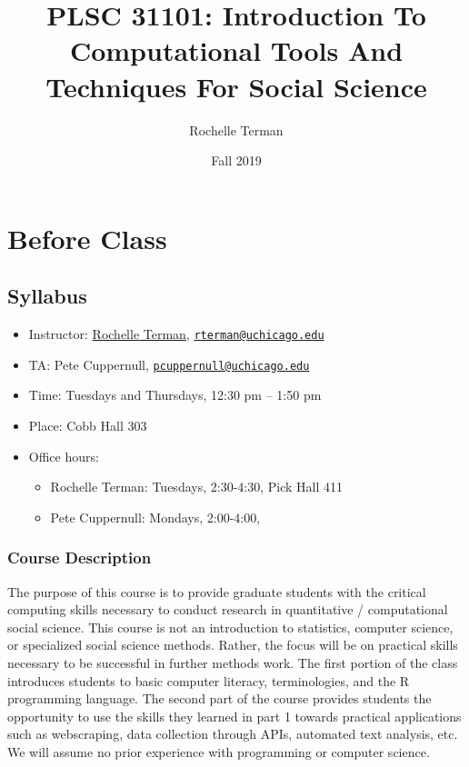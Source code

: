 \documentclass[]{book}
\title{PLSC 31101: Introduction To Computational Tools And Techniques For
Social Science}
\author{Rochelle Terman}
\date{Fall 2019}
\providecommand{\tightlist}{%
  \setlength{\itemsep}{0pt}\setlength{\parskip}{0pt}}
\begin{document}
\maketitle

{
\setcounter{tocdepth}{1}
\tableofcontents
}
\part{Before Class}\label{part-before-class}

\chapter{Syllabus}\label{syllabus}

\begin{itemize}
\item
  Instructor: \href{http://rochelleterman.com/}{Rochelle Terman},
  \href{mailto:rterman@uchicago.edu}{\nolinkurl{rterman@uchicago.edu}}
\item
  TA: Pete Cuppernull,
  \href{mailto:pcuppernull@uchicago.edu}{\nolinkurl{pcuppernull@uchicago.edu}}
\item
  Time: Tuesdays and Thursdays, 12:30 pm -- 1:50 pm
\item
  Place: Cobb Hall 303
\item
  Office hours:

  \begin{itemize}
  \tightlist
  \item
    Rochelle Terman: Tuesdays, 2:30-4:30, Pick Hall 411
  \item
    Pete Cuppernull: Mondays, 2:00-4:00,
  \end{itemize}
\end{itemize}

\section{Course Description}\label{course-description}

The purpose of this course is to provide graduate students with the
critical computing skills necessary to conduct research in quantitative
/ computational social science. This course is not an introduction to
statistics, computer science, or specialized social science methods.
Rather, the focus will be on practical skills necessary to be successful
in further methods work. The first portion of the class introduces
students to basic computer literacy, terminologies, and the R
programming language. The second part of the course provides students
the opportunity to use the skills they learned in part 1 towards
practical applications such as webscraping, data collection through
APIs, automated text analysis, etc. We will assume no prior experience
with programming or computer science.
\end{document}
